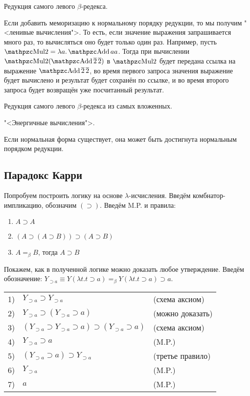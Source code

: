 \begin{definition}
    Редукция самого левого $\beta$-редекса.
\end{definition}
Если добавить меморизацию к нормальному порядку редукции, то мы получим "<ленивые вычисления">.
То есть, если значение выражения запрашивается много раз, то вычисляться оно будет только один раз.
Например, пусть $\comb{Mul2} = \lambda a . \comb{Add} a a$.
Тогда при вычислении $\comb{Mul2} (\comb{Add} \mathinner{\overline 2} \overline 2)$ в $\comb{Mul2}$ будет передана ссылка
на выражение $\comb{Add} \mathinner{\overline 2} \overline 2$,
во время первого запроса значения выражение будет вычислено и результат будет сохранён по ссылке,
и во время второго запроса будет возвращён уже посчитанный результат.

\begin{definition}
    Редукция самого левого $\beta$-редекса из самых вложенных.
\end{definition}
"<Энергичные вычисления">.

\begin{statement}
    Если нормальная форма существует, она может быть достигнута нормальным порядком редукции.
\end{statement}

\subsection{\texorpdfstring{Парадокс Карри}{Curry's paradox}}

Попробуем построить логику на основе $\lambda$-исчисления.
Введём комбнатор-импликацию, обозначим $(\supset)$. Введём M.P. и правила:
\begin{enumerate}
    \item $A \supset A$
    \item $(A \supset (A \supset B)) \supset (A \supset B)$
    \item $A =_{\beta} B$, тогда $A \supset B$
\end{enumerate}

Покажем, как в полученной логике можно доказать любое утверждение.
Введём обозначение: $Y_{\supset a} \equiv Y (\lambda t . t \supset a) =_{\beta} Y (\lambda t . t \supset a) \supset a$.

\begin{tabular}{lll}
    1) & $Y_{\supset a} \supset Y_{\supset a}$ & (схема аксиом) \\
    2) & $Y_{\supset a} \supset (Y_{\supset a} \supset a)$ & (можно доказать) \\
    3) & $(Y_{\supset a} \supset Y_{\supset a} \supset a) \supset (Y_{\supset a} \supset a)$ & (схема аксиом) \\
    4) & $Y_{\supset a} \supset a$ & (M.P.) \\
    5) & $(Y_{\supset a} \supset a) \supset Y_{\supset a}$ & (третье правило) \\
    6) & $Y_{\supset a}$ & (M.P.) \\
    7) & $a$ & (M.P.)
\end{tabular}

